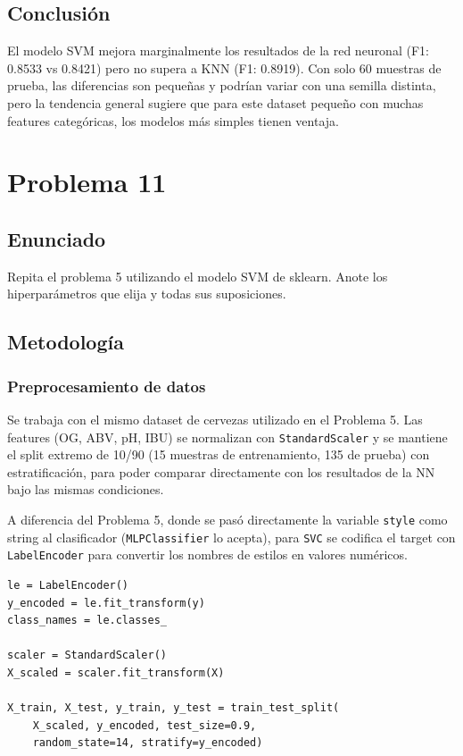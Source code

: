\documentclass{article}
\begin{document}
\subsection{Conclusión}

El modelo SVM mejora marginalmente los resultados de la red neuronal (F1: 0.8533 vs 0.8421) pero no supera a KNN (F1: 0.8919). Con solo 60 muestras de prueba, las diferencias son pequeñas y podrían variar con una semilla distinta, pero la tendencia general sugiere que para este dataset pequeño con muchas features categóricas, los modelos más simples tienen ventaja.

\section{Problema 11}

\subsection{Enunciado}

Repita el problema 5 utilizando el modelo SVM de sklearn. Anote los hiperparámetros que elija y todas sus suposiciones.

\subsection{Metodología}

\subsubsection{Preprocesamiento de datos}

Se trabaja con el mismo dataset de cervezas utilizado en el Problema 5. Las features (OG, ABV, pH, IBU) se normalizan con \texttt{StandardScaler} y se mantiene el split extremo de 10/90 (15 muestras de entrenamiento, 135 de prueba) con estratificación, para poder comparar directamente con los resultados de la NN bajo las mismas condiciones.

A diferencia del Problema 5, donde se pasó directamente la variable \texttt{style} como string al clasificador (\texttt{MLPClassifier} lo acepta), para \texttt{SVC} se codifica el target con \texttt{LabelEncoder} para convertir los nombres de estilos en valores numéricos.

\begin{lstlisting}
le = LabelEncoder()
y_encoded = le.fit_transform(y)
class_names = le.classes_

scaler = StandardScaler()
X_scaled = scaler.fit_transform(X)

X_train, X_test, y_train, y_test = train_test_split(
    X_scaled, y_encoded, test_size=0.9, 
    random_state=14, stratify=y_encoded)
\end{lstlisting}
\end{document}
